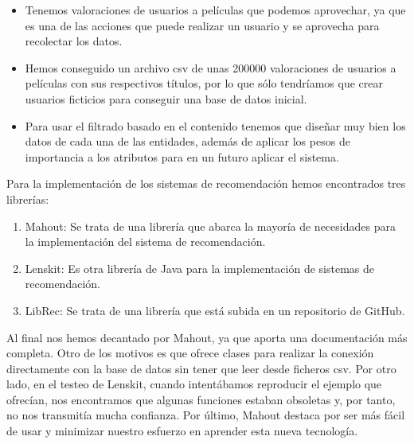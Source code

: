 \begin{itemize}
    \item Tenemos valoraciones de usuarios a películas que podemos aprovechar, ya que es una de las acciones que puede realizar un usuario y se aprovecha para recolectar los datos.
    \item Hemos conseguido un archivo csv de unas 200000 valoraciones de usuarios a películas con sus respectivos títulos, por lo que sólo tendríamos que crear usuarios ficticios para conseguir una base de datos inicial.
    \item Para usar el filtrado basado en el contenido tenemos que diseñar muy bien los datos de cada una de las entidades, además de aplicar los pesos de importancia a los atributos para en un futuro aplicar el sistema.  
\end{itemize} 
Para la implementación de los sistemas de recomendación hemos encontrados tres librerías:
\begin{enumerate}
    \item Mahout: Se trata de una librería que abarca la mayoría de necesidades para la implementación del sistema de recomendación.
    \item Lenskit: Es otra librería de Java para la implementación de sistemas de recomendación.
    \item LibRec: Se trata de una librería que está subida en un repositorio de GitHub.
\end{enumerate}

Al final nos hemos decantado por Mahout, ya que aporta una documentación más completa. Otro de los motivos es que ofrece clases para realizar la conexión directamente con la base de datos 
sin tener que leer desde ficheros csv. Por otro lado, en el testeo de 
Lenskit, cuando intentábamos reproducir el ejemplo que ofrecían, nos encontramos que algunas funciones estaban 
obsoletas y, por tanto, no nos transmitía mucha confianza. Por último, Mahout destaca por ser más fácil de usar y minimizar nuestro esfuerzo en aprender esta nueva tecnología.
